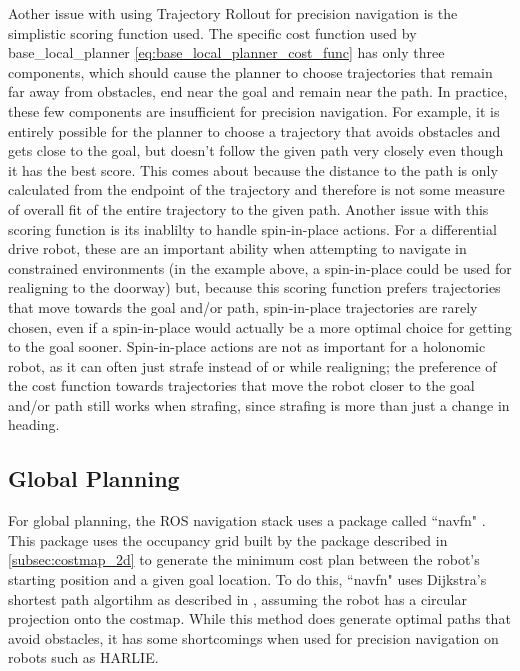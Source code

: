 Aother issue with using Trajectory Rollout for precision navigation is the simplistic scoring function used. The specific cost function used by base\_local\_planner \eqref{eq:base_local_planner_cost_func} has only three components, which should cause the planner to choose trajectories that remain far away from obstacles, end near the goal and remain near the path. In practice, these few components are insufficient for precision navigation. For example, it is entirely possible for the planner to choose a trajectory that avoids obstacles and gets close to the goal, but doesn't follow the given path very closely even though it has the best score. This comes about because the distance to the path is only calculated from the endpoint of the trajectory and therefore is not some measure of overall fit of the entire trajectory to the given path. Another issue with this scoring function is its inablilty to handle spin-in-place actions. For a differential drive robot, these are an important ability when attempting to navigate in constrained environments (in the example above, a spin-in-place could be used for realigning to the doorway) but, because this scoring function prefers trajectories that move towards the goal and/or path, spin-in-place trajectories are rarely chosen, even if a spin-in-place would actually be a more optimal choice for getting to the goal sooner. Spin-in-place actions are not as important for a holonomic robot, as it can often just strafe instead of or while realigning; the preference of the cost function towards trajectories that move the robot closer to the goal and/or path still works when strafing, since strafing is more than just a change in heading.

\subsection{Global Planning}\label{subsec:navfn}

For global planning, the ROS navigation stack uses a package called ``navfn" \autocite{NavFnWiki}. This package uses the occupancy grid built by the package described in \autoref{subsec:costmap_2d} to generate the minimum cost plan between the robot's starting position and a given goal location. To do this, ``navfn" uses Dijkstra's shortest path algortihm as described in \autocite{Lav06}, assuming the robot has a circular projection onto the costmap. While this method does generate optimal paths that avoid obstacles, it has some shortcomings when used for precision navigation on robots such as HARLIE.

